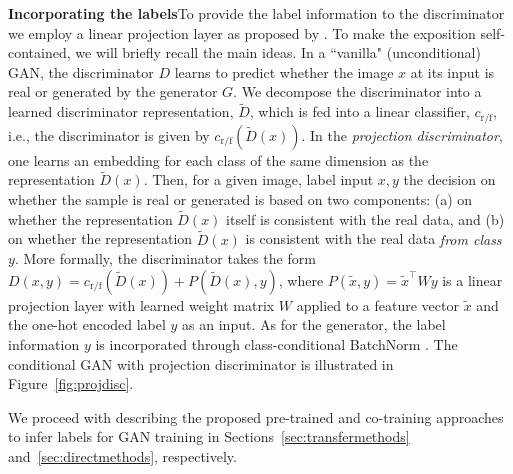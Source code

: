 \documentclass{article}
\newcommand{\cRF}{c_\text{r/f}}
\newcommand{\Dt}{\tilde D}
\begin{document}
\textbf{Incorporating the labels}\quad To provide the label information to the discriminator we employ a linear projection layer as proposed by \citet{miyato2018cgans}. To make the exposition self-contained, we will briefly recall the main ideas. In a ``vanilla" (unconditional) GAN, the discriminator $D$ learns to predict whether the image $x$ at its input is real or generated by the generator $G$. We decompose the discriminator into a learned discriminator representation, $\Dt$, which is fed into a linear classifier, $\cRF$, i.e., the discriminator is given by $\cRF(\Dt(x))$. In the \emph{projection discriminator}, one learns an embedding for each class of the same dimension as the representation $\Dt(x)$. Then, for a given image, label input $x, y$ the decision on whether the sample is real or generated is based on two components: (a) on whether the representation $\Dt(x)$ itself is consistent with the real data, and (b) on whether the representation $\Dt(x)$ is consistent with the real data \emph{from class $y$}. More formally, the discriminator takes the form $D(x,y) = \cRF(\Dt(x)) + P(\Dt(x), y)$, where 
$P(\tilde x, y) = {\tilde x}^\top W y$ is a linear projection layer with learned weight matrix $W$ applied to a feature vector $\tilde x$ and the one-hot encoded label $y$ as an input. 
As for the generator, the label information $y$ is incorporated through class-conditional BatchNorm \cite{dumoulin2017learned, de2017modulating}. The conditional GAN with projection discriminator is illustrated in Figure~\ref{fig:projdisc}.

We proceed with describing the proposed pre-trained and co-training approaches to infer labels for GAN training in Sections~\ref{sec:transfermethods} and~\ref{sec:directmethods}, respectively.

\newcommand{\sw}{0.35\textwidth}
\newcommand{\deflabels}{
\node[] at (0.22, 0.73) {$G$};
 \node[] at (-0.01, 0.8) {$y_\text{f}$};
 \node[] at (0, 0.67) {$z$};
 \node[] at (0.67, 0.48) {$\tilde D$};
 \node[] at (0.48, 0.85) {$x_\text{f}$};
 \node[] at (0.36, 0.12) {$x_\text{r}$};
 \node[] at (0.97, 0.21) {$y_\text{f}$};
 \node[] at (0.885, 0.54) {\footnotesize$\cRF$};
 \node[] at (0.885, 0.42) {\footnotesize$P$};
}
\end{document}
